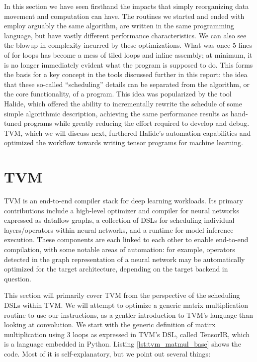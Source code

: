 \documentclass[acmsmall, nonacm=true]{acmart}
\begin{document}
In this section we have seen firsthand the impacts that simply reorganizing data movement and computation can have. The routines we started and ended with employ arguably the same algorithm, are written in the same programming language, but have vastly different performance characteristics. We can also see the blowup in complexity incurred by these optimizations. What was once 5 lines of for loops has become a mess of tiled loops and inline assembly; at minimum, it is no longer immediately evident what the program is supposed to do. This forms the basis for a key concept in the tools discussed further in this report: the idea that these so-called ``scheduling'' details can be separated from the algorithm, or the core functionality, of a program. This idea was popularized by the tool Halide, which offered the ability to incrementally rewrite the schedule of some simple algorithmic description, achieving the same performance results as hand-tuned programs while greatly reducing the effort required to develop and debug. TVM, which we will discuss next, furthered Halide's automation capabilities and optimized the workflow towards writing tensor programs for machine learning.


\section{TVM}

TVM\cite{tvm} is an end-to-end compiler stack for deep learning workloads. Its primary contributions include a high-level optimizer and compiler for neural networks expressed as dataflow graphs, a collection of DSLs for scheduling individual layers/operators within neural networks, and a runtime for model inference execution. These components are each linked to each other to enable end-to-end compilation, with some notable areas of automation: for example, operators detected in the graph representation of a neural network may be automatically optimized for the target architecture, depending on the target backend in question.

This section will primarily cover TVM from the perspective of the scheduling DSLs within TVM. We will attempt to optimize a generic matrix multiplication routine to use our instructions, as a gentler introduction to TVM's language than looking at convolution. We start with the generic definition of matirx multiplication using 3 loops as expressed in TVM's DSL, called TensorIR, which is a language embedded in Python. Listing \ref{lst:tvm_matmul_base} shows the code. Most of it is self-explanatory, but we point out several things:
\end{document}

